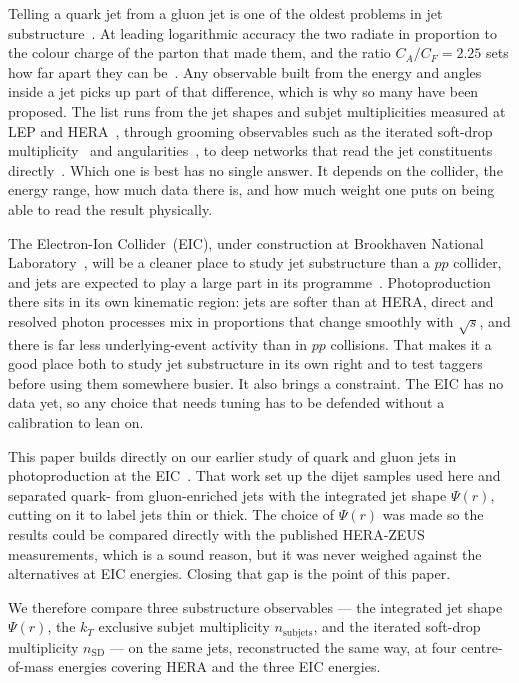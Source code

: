 \documentclass[reprint,amsmath,amssymb,aps,prd,floatfix]{revtex4-2}
\begin{document}
Telling a quark jet from a gluon jet is one of the oldest problems in jet
substructure~\cite{Gallicchio_2013,gras2017systematics}. At leading logarithmic
accuracy the two radiate in proportion to the colour charge of the parton that
made them, and the ratio $C_A / C_F = 2.25$ sets how far apart they can
be~\cite{Ellis:1991qcd,PDG_QCD}. Any observable built from the energy and
angles inside a jet picks up part of that difference, which is why so many have
been proposed. The list runs from the jet shapes and subjet multiplicities
measured at LEP and
HERA~\cite{opal1993study,aleph2000measurements,zeus1998measurement,Chekanov_2008},
through grooming observables such as the iterated soft-drop
multiplicity~\cite{Frye:2017yrw,Larkoski:2014wba} and
angularities~\cite{Larkoski:2014gra}, to deep networks that read the jet
constituents directly~\cite{Komiske_2018,Metodiev_2018,larkoski2020jet}. Which
one is best has no single answer. It depends on the collider, the energy range,
how much data there is, and how much weight one puts on being able to read the
result physically.

The Electron-Ion Collider~(EIC), under construction at Brookhaven National
Laboratory~\cite{Accardi:2012qut,khalek2022science}, will be a cleaner place to
study jet substructure than a $pp$ collider, and jets are expected to play a
large part in its programme~\cite{PhysRevD_101,Arratia_2020}. Photoproduction
there sits in its own kinematic region: jets are softer than at HERA, direct and
resolved photon processes mix in proportions that change smoothly with
$\sqrt{s}$, and there is far less underlying-event activity than in $pp$
collisions. That makes it a good place both to study jet substructure in its own
right and to test taggers before using them somewhere busier. It also brings a
constraint. The EIC has no data yet, so any choice that needs tuning has to be
defended without a calibration to lean on.

This paper builds directly on our earlier study of quark and gluon jets in
photoproduction at the EIC~\cite{Singh:2026photo}. That work set up the dijet
samples used here and separated quark- from gluon-enriched jets with the
integrated jet shape $\Psi(r)$, cutting on it to label jets thin or thick. The
choice of $\Psi(r)$ was made so the results could be compared directly with the
published HERA-ZEUS measurements, which is a sound reason, but it was never
weighed against the alternatives at EIC energies. Closing that gap is the point
of this paper.

We therefore compare three substructure observables --- the integrated jet shape
$\Psi(r)$, the $k_T$ exclusive subjet multiplicity $n_{\mathrm{subjets}}$, and
the iterated soft-drop multiplicity $n_{\mathrm{SD}}$ --- on the same jets,
reconstructed the same way, at four centre-of-mass energies covering HERA and
the three EIC energies.
\end{document}
